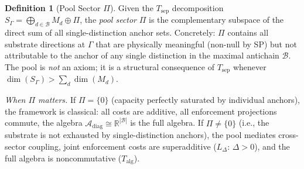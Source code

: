 \documentclass[11pt,a4paper]{article}
\theoremstyle{definition}
\newtheorem{definition}[theorem]{Definition}
\begin{document}
\begin{definition}[Pool Sector $\Pi$]\label{def:pool}
Given the $T_{\mathrm{sep}}$ decomposition $S_\Gamma = \bigoplus_{d \in \mathcal{B}} M_d \oplus \Pi$, the \emph{pool sector} $\Pi$ is the complementary subspace of the direct sum of all single-distinction anchor sets.  Concretely: $\Pi$ contains all substrate directions at $\Gamma$ that are physically meaningful (non-null by SP) but not attributable to the anchor of any single distinction in the maximal antichain $\mathcal{B}$.  The pool is \emph{not} an axiom; it is a structural consequence of $T_{\mathrm{sep}}$ whenever $\dim(S_\Gamma) > \sum_d \dim(M_d)$.

\smallskip\noindent\textit{When $\Pi$ matters.}  If $\Pi = \{0\}$ (capacity perfectly saturated by individual anchors), the framework is classical: all costs are additive, all enforcement projections commute, the algebra $\mathcal{A}_{\mathrm{diag}} \cong \mathbb{R}^{|\mathcal{B}|}$ is the full algebra.  If $\Pi \ne \{0\}$ (i.e., the substrate is not exhausted by single-distinction anchors), the pool mediates cross-sector coupling, joint enforcement costs are superadditive ($L_\Delta$: $\Delta > 0$), and the full algebra is noncommutative ($T_{\mathrm{alg}}$).
\end{definition}
\end{document}

